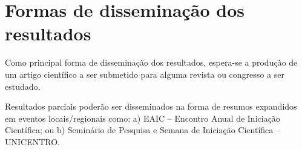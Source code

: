 \section{Formas de disseminação dos resultados}

Como principal forma de disseminação dos resultados, espera-se a produção de um artigo científico a ser submetido para alguma revista ou congresso a ser estudado.

Resultados parciais poderão ser disseminados na forma de resumos expandidos em eventos locais/regionais como: a) EAIC – Encontro Anual de Iniciação Científica; ou b) Seminário de Pesquisa e Semana de Iniciação Científica – UNICENTRO.